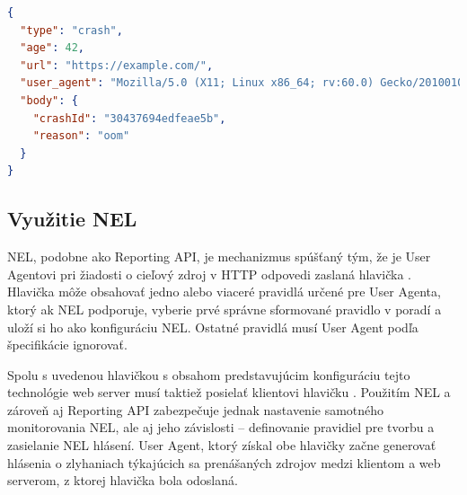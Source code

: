 \begin{center}
\centering
\begin{lstlisting}[caption={\centering Príklad obsahu zaslaného hlásenia pre zlyhanie webového prehliadača. Hlásenie bolo odoslané 42 milisekúnd po jeho vytvorení na prehliadači Mozilla. Vygenerované bolo chybou, ktorá nastala po získaní zdroja prislúchajúceho k URL \code{https://example.com}. \mbox{Telo hlásenia} obsahuje ID zlyhania a ako dôvod je uvedená hodnota \code{oom}, ktorá reprezentuje chybu \textit{Out Of Memory} (nedostatok pamäte).},
label=listing:priklad-generated-report, 
language=json, 
frame=tb,
xleftmargin=.085\textwidth, 
xrightmargin=.085\textwidth]
{
  "type": "crash",
  "age": 42,
  "url": "https://example.com/",
  "user_agent": "Mozilla/5.0 (X11; Linux x86_64; rv:60.0) Gecko/20100101 Firefox/60.0",
  "body": {
    "crashId": "30437694edfeae5b",
    "reason": "oom"
  }
}
\end{lstlisting}
\end{center}



\subsection{Využitie NEL}
\label{network-error-logging-spec}

NEL, podobne ako Reporting API, je mechanizmus spúšťaný tým, že je User Agentovi pri žiadosti o cieľový zdroj v HTTP odpovedi zaslaná hlavička .
Hlavička  môže obsahovať jedno alebo viaceré pravidlá určené pre User Agenta, ktorý ak NEL podporuje, vyberie prvé správne sformované pravidlo v poradí a uloží si ho ako konfiguráciu NEL.
Ostatné pravidlá musí User Agent podľa špecifikácie ignorovať.

Spolu s uvedenou hlavičkou s obsahom predstavujúcim konfiguráciu tejto technológie web server musí taktiež posielať klientovi hlavičku . 
Použitím NEL a zároveň aj Reporting API zabezpečuje jednak nastavenie samotného monitorovania NEL, ale aj jeho závislosti -- definovanie pravidiel pre tvorbu a zasielanie NEL hlásení.
User Agent, ktorý získal obe hlavičky začne generovať hlásenia o zlyhaniach týkajúcich sa prenášaných zdrojov medzi klientom a web serverom, z ktorej  hlavička bola odoslaná. 

